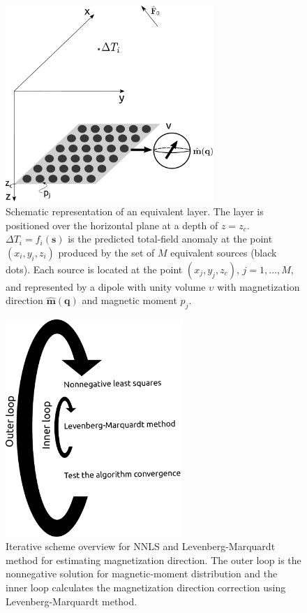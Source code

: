 

\begin{figure}
	\centering
	\includegraphics[width=0.7\textwidth]{Fig/eqlayer_figure.pdf}
	\caption{Schematic representation of an equivalent layer. The layer is positioned over the horizontal plane at a depth of $z=z_c$. $\Delta T_i =  f_i (\mathbf{s})$ is the predicted total-field anomaly at the point $(x_i,y_i,z_i)$ produced by the set of $M$ equivalent sources (black dots). Each source is located at the point $(x_j,y_j,z_c)$, $j = 1,\hdots, M$, and represented by a dipole with unity volume $\upsilon$ with magnetization direction $\hat{\mathbf{m}}(\mathbf{q})$ and magnetic moment $p_j$.    }
	\label{fig:eqlayer_figure}
\end{figure}


\begin{figure}
	\centering
	\includegraphics[width=0.6\textwidth]{Fig/algorithm_LM_NNLS.pdf}
	\caption{Iterative scheme overview for NNLS and Levenberg-Marquardt method for estimating magnetization direction. The outer loop is the nonnegative solution for magnetic-moment distribution and the inner loop calculates the magnetization direction correction using Levenberg-Marquardt method.}
	\label{fig:scheme_LM_NNLS}
\end{figure}

